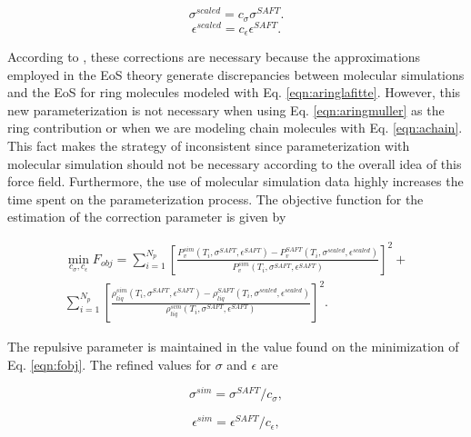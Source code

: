     \begin{equation}
    \sigma^{scaled} = c_{\sigma}\sigma^{SAFT}.
    \label{eqn:csigma}
    \end{equation}
    \begin{equation}
    \epsilon^{scaled} = c_{\epsilon}\epsilon^{SAFT}.
    \label{eqn:ceps}
    \end{equation}
    
    According to , these corrections are necessary because the approximations employed in the EoS theory generate discrepancies between molecular simulations and the EoS for ring molecules modeled with Eq. \eqref{eqn:aringlafitte}. However, this new parameterization is not necessary when using Eq. \eqref{eqn:aringmuller} as the ring contribution or when we are modeling chain molecules with Eq. \ref{eqn:achain}. This fact makes the strategy of  inconsistent since parameterization with molecular simulation should not be necessary according to the overall idea of this force field. Furthermore, the use of molecular simulation data highly increases the time spent on the parameterization process. The objective function for the estimation of the correction parameter is given by
     
    \begin{equation}
    \begin{split}
    \min\limits_{c_{\sigma},c_{\epsilon}} F_{obj}= \sum_{i=1}^{N_{p}} \left[\frac{P_{v}^{sim}(T_{i},\sigma^{SAFT},\epsilon^{SAFT})-P_{v}^{SAFT}(T_{i},\sigma^{scaled},\epsilon^{scaled})}{P_{v}^{sim}(T_{i},\sigma^{SAFT},\epsilon^{SAFT})} \right]^2 + \\
    \sum_{i=1}^{N_{p}} \left[\frac{\rho_{liq}^{sim}(T_{i},\sigma^{SAFT},\epsilon^{SAFT})-\rho_{liq}^{SAFT}(T_{i},\sigma^{scaled},\epsilon^{scaled})}{\rho_{liq}^{sim}(T_{i},\sigma^{SAFT},\epsilon^{SAFT})} \right]^2 .
    \end{split}
    \label{eqn:fobjla}
    \end{equation}
    
    The repulsive parameter is maintained in the value found on the minimization of Eq. \eqref{eqn:fobj}. The refined values for $\sigma$ and $\epsilon$ are
    
    \begin{equation}
    \sigma^{sim} = \sigma^{SAFT}/c_{\sigma},
    \label{eqn:simsigma}
    \end{equation}
    
    \begin{equation}
    \epsilon^{sim} = \epsilon^{SAFT}/c_{\epsilon},
    \label{eqn:simeps}
    \end{equation}
    
